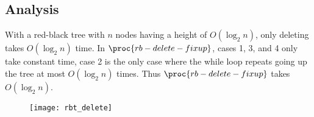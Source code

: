 \documentclass{article}
\begin{document}
\subsection*{Analysis}
With a red-black tree with $n$ nodes having a height of $O(\log_{2}n)$, only deleting takes $O(\log_{2}n)$ time. In $\proc{rb-delete-fixup}$, cases 1, 3, and 4 only take constant time, case 2 is the only case where the while loop repeats going up the tree at most $O(\log_{2}n)$ times. Thus $\proc{rb-delete-fixup}$ takes $O(\log_{2}n)$.

\newpage

\begin{figure}[!ht]
\texttt{[image: rbt\_delete]}
\label{fig: rbt_delete}
\end{figure}
\end{document}
